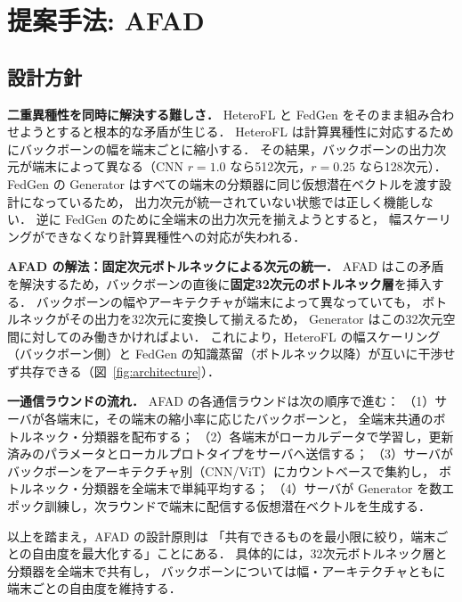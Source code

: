 \section{提案手法: AFAD}

\subsection{設計方針}

\textbf{二重異種性を同時に解決する難しさ．}
HeteroFL と FedGen をそのまま組み合わせようとすると根本的な矛盾が生じる．
HeteroFL は計算異種性に対応するためにバックボーンの幅を端末ごとに縮小する．
その結果，バックボーンの出力次元が端末によって異なる（CNN $r=1.0$ なら512次元，$r=0.25$ なら128次元）．
FedGen の Generator はすべての端末の分類器に同じ仮想潜在ベクトルを渡す設計になっているため，
出力次元が統一されていない状態では正しく機能しない．
逆に FedGen のために全端末の出力次元を揃えようとすると，
幅スケーリングができなくなり計算異種性への対応が失われる．

\textbf{AFAD の解法：固定次元ボトルネックによる次元の統一．}
AFAD はこの矛盾を解決するため，バックボーンの直後に\textbf{固定32次元のボトルネック層}を挿入する．
バックボーンの幅やアーキテクチャが端末によって異なっていても，
ボトルネックがその出力を32次元に変換して揃えるため，
Generator はこの32次元空間に対してのみ働きかければよい．
これにより，HeteroFL の幅スケーリング（バックボーン側）と
FedGen の知識蒸留（ボトルネック以降）が互いに干渉せず共存できる（図~\ref{fig:architecture}）．

\textbf{一通信ラウンドの流れ．}
AFAD の各通信ラウンドは次の順序で進む：
（1）サーバが各端末に，その端末の縮小率に応じたバックボーンと，
全端末共通のボトルネック・分類器を配布する；
（2）各端末がローカルデータで学習し，更新済みのパラメータとローカルプロトタイプをサーバへ送信する；
（3）サーバがバックボーンをアーキテクチャ別（CNN/ViT）にカウントベースで集約し，
ボトルネック・分類器を全端末で単純平均する；
（4）サーバが Generator を数エポック訓練し，次ラウンドで端末に配信する仮想潜在ベクトルを生成する．

以上を踏まえ，AFAD の設計原則は
「共有できるものを最小限に絞り，端末ごとの自由度を最大化する」ことにある．
具体的には，32次元ボトルネック層と分類器を全端末で共有し，
バックボーンについては幅・アーキテクチャともに端末ごとの自由度を維持する．


